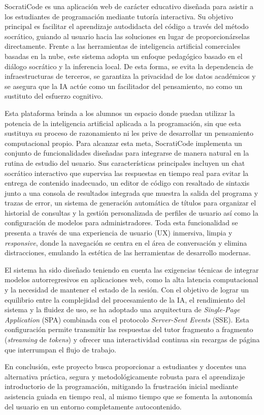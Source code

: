 SocratiCode es una aplicación web de carácter educativo diseñada para asistir a los estudiantes de programación mediante tutoría interactiva. Su objetivo principal es facilitar el aprendizaje autodidacta del código a través del método socrático, guiando al usuario hacia las soluciones en lugar de proporcionárselas directamente. Frente a las herramientas de inteligencia artificial comerciales basadas en la nube, este sistema adopta un enfoque pedagógico basado en el diálogo socrático y la inferencia local. De esta forma, se evita la dependencia de infraestructuras de terceros, se garantiza la privacidad de los datos académicos y se asegura que la IA actúe como un facilitador del pensamiento, no como un sustituto del esfuerzo cognitivo.

Esta plataforma brinda a los alumnos un espacio donde puedan utilizar la potencia de la inteligencia artificial aplicada a la programación, sin que esta sustituya su proceso de razonamiento ni les prive de desarrollar un pensamiento computacional propio. Para alcanzar esta meta, SocratiCode implementa un conjunto de funcionalidades diseñadas para integrarse de manera natural en la rutina de estudio del usuario. Sus características principales incluyen un chat socrático interactivo que supervisa las respuestas en tiempo real para evitar la entrega de contenido inadecuado, un editor de código con resaltado de sintaxis junto a una consola de resultados integrada que muestra la salida del programa y trazas de error, un sistema de generación automática de títulos para organizar el historial de consultas y la gestión personalizada de perfiles de usuario así como la configuración de modelos para administradores. Toda esta funcionalidad se presenta a través de una experiencia de usuario (UX) inmersiva, limpia y \textit{responsive}, donde la navegación se centra en el área de conversación y elimina distracciones, emulando la estética de las herramientas de desarrollo modernas.

El sistema ha sido diseñado teniendo en cuenta las exigencias técnicas de integrar modelos autorregresivos en aplicaciones web, como la alta latencia computacional y la necesidad de mantener el estado de la sesión. Con el objetivo de lograr un equilibrio entre la complejidad del procesamiento de la IA, el rendimiento del sistema y la fluidez de uso, se ha adoptado una arquitectura de \textit{Single-Page Application} (SPA) combinada con el protocolo \textit{Server-Sent Events} (SSE). Esta configuración permite transmitir las respuestas del tutor fragmento a fragmento (\textit{streaming} de \textit{tokens}) y ofrecer una interactividad continua sin recargas de página que interrumpan el flujo de trabajo.

En conclusión, este proyecto busca proporcionar a estudiantes y docentes una alternativa práctica, segura y metodológicamente robusta para el aprendizaje introductorio de la programación, mitigando la frustración inicial mediante asistencia guiada en tiempo real, al mismo tiempo que se fomenta la autonomía del usuario en un entorno completamente autocontenido.